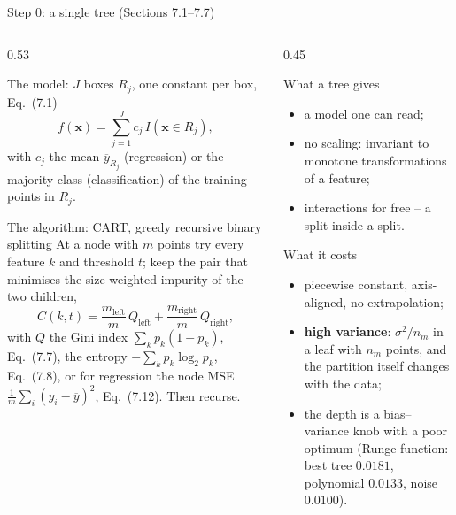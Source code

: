 \documentclass[10pt,aspectratio=169]{beamer}
\begin{document}
\begin{frame}{Step 0: a single tree (Sections 7.1--7.7)}
\begin{columns}[T]
\begin{column}{0.53\textwidth}
\footnotesize
\begin{block}{The model: $J$ boxes $R_j$, one constant per box, Eq.\ (7.1)}
\[
f(\bm{x})=\sum_{j=1}^{J}c_j\,I(\bm{x}\in R_j),
\]
with $c_j$ the mean $\overline{y}_{R_j}$ (regression) or the majority class
(classification) of the training points in $R_j$.
\end{block}
\begin{block}{The algorithm: CART, greedy recursive binary splitting}
At a node with $m$ points try every feature $k$ and threshold $t$; keep the
pair that minimises the size-weighted impurity of the two children,
\[
C(k,t)=\frac{m_{\mathrm{left}}}{m}\,Q_{\mathrm{left}}
      +\frac{m_{\mathrm{right}}}{m}\,Q_{\mathrm{right}},\tag{7.9}
\]
with $Q$ the Gini index $\sum_kp_k(1-p_k)$, Eq.\ (7.7), the entropy
$-\sum_kp_k\log_2p_k$, Eq.\ (7.8), or for regression the node MSE
$\frac1m\sum_i(y_i-\overline{y})^2$, Eq.\ (7.12).  Then recurse.
\end{block}
\end{column}
\begin{column}{0.45\textwidth}
\footnotesize
\begin{block}{What a tree gives}
\begin{itemize}
  \item a model one can read;
  \item no scaling: invariant to monotone transformations of a feature;
  \item interactions for free -- a split inside a split.
\end{itemize}
\end{block}
\begin{block}{What it costs}
\begin{itemize}
  \item piecewise constant, axis-aligned, no extrapolation;
  \item \textbf{high variance}: $\sigma^2/n_m$ in a leaf with $n_m$ points,
    and the partition itself changes with the data;
  \item the depth is a bias--variance knob with a poor optimum (Runge
    function: best tree $0.0181$, polynomial $0.0133$, noise $0.0100$).
\end{itemize}
\end{block}
\end{column}
\end{columns}
\end{frame}
\end{document}
